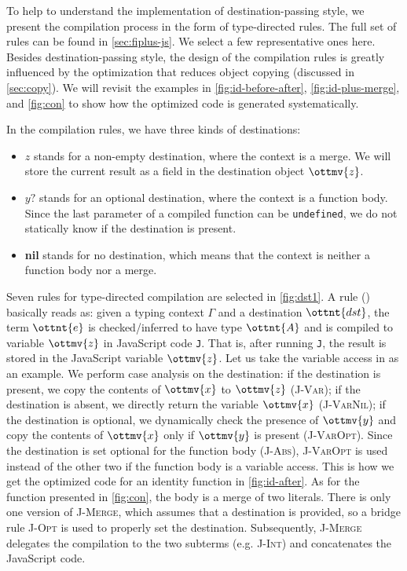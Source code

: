 To help to understand the implementation of destination-passing style, we
present the compilation process in the form of type-directed rules. The full set
of rules can be found in \autoref{sec:fiplus-js}. We select a few representative
ones here. Besides destination-passing style, the design of the compilation
rules is greatly influenced by the optimization that reduces object copying
(discussed in \autoref{sec:copy}). We will revisit the examples in
\autoref{fig:id-before-after}, \autoref{fig:id-plus-merge}, and
\autoref{fig:con} to show how the optimized code is generated systematically.

In the compilation rules, we have three kinds of destinations:
\begin{itemize}
\item $z$ stands for a non-empty destination, where the context is a merge. We
      will store the current result as a field in the destination object
      $\ottmv{z}$.
\item $y?$ stands for an optional destination, where the context is a function
      body. Since the last parameter of a compiled function can be
      \lstinline{undefined}, we do not statically know if the destination is
      present.
\item \textbf{nil} stands for no destination, which means that the context is
      neither a function body nor a merge.
\end{itemize}
Seven rules for type-directed compilation are selected in \autoref{fig:dst1}. A
rule (\compilation) basically reads as: given a typing context $\Gamma$ and a
destination $\ottnt{dst}$, the \fiplus term $\ottnt{e}$ is checked/inferred to have
type $\ottnt{A}$ and is compiled to variable $\ottmv{z}$ in JavaScript code
\texttt{J}. That is, after running \texttt{J}, the result is stored in the
JavaScript variable $\ottmv{z}$. Let us take the variable access in \fiplus as
an example. We perform case analysis on the destination: if the destination is
present, we copy the contents of $\ottmv{x}$ to $\ottmv{z}$ (\textsc{J-Var}); if
the destination is absent, we directly return the variable $\ottmv{x}$
(\textsc{J-VarNil}); if the destination is optional, we dynamically check the
presence of $\ottmv{y}$ and copy the contents of $\ottmv{x}$ only if $\ottmv{y}$
is present (\textsc{J-VarOpt}). Since the destination is set optional for the
function body (\textsc{J-Abs}), \textsc{J-VarOpt} is used instead of the other
two if the function body is a variable access. This is how we get the optimized
code for an identity function in \autoref{fig:id-after}. As for the function
presented in \autoref{fig:con}, the body is a merge of two literals. There is
only one version of \textsc{J-Merge}, which assumes that a destination is
provided, so a bridge rule \textsc{J-Opt} is used to properly set the
destination. Subsequently, \textsc{J-Merge} delegates the compilation to the two
subterms (e.g. \textsc{J-Int}) and concatenates the JavaScript code.

